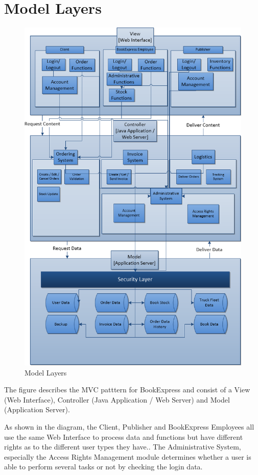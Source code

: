 \documentclass[11pt,a4paper,oneside,svgnames]{report}
\begin{document}
\section{Model Layers}
\begin{figure}[H]
 \begin{center}
  \includegraphics[scale=0.68]{LayeredModel.png}
 \end{center}
 \caption{Model Layers}
\end{figure}

The figure describes the MVC patttern for BookExpress and consist of a View (Web Interface), Controller (Java Application / Web Server) and Model (Application Server).

As shown in the diagram, the Client, Publisher and BookExpress Employees all use the same Web Interface to process data and functions but have different rights as to the different user types they have.. 
The Administrative System, especially the Access Rights Management module determines whether a user is able to perform several tasks or not by checking the login data. 
\end{document}
